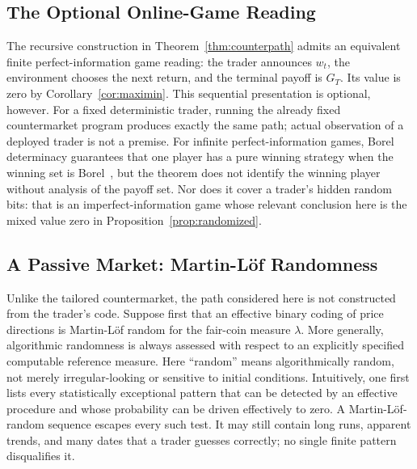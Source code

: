 \documentclass[aps,pra,reprint,superscriptaddress,amsmath,amssymb,floatfix]{revtex4-2}
\theoremstyle{plain}
\theoremstyle{definition}
\theoremstyle{remark}
\begin{document}
\subsection{The Optional Online-Game Reading}

The recursive construction in Theorem~\ref{thm:counterpath} admits an
equivalent finite perfect-information game reading: the trader announces
\(w_t\), the environment chooses the next return, and the terminal payoff is
\(G_T\). Its value is zero by Corollary~\ref{cor:maximin}. This sequential
presentation is optional, however. For a fixed deterministic trader, running
the already fixed countermarket program produces exactly the same path; actual
observation of a deployed trader is not a premise. For infinite
perfect-information games, Borel determinacy guarantees that one player has a
pure winning strategy when the winning set is Borel~\cite{Martin1975}, but the
theorem does not identify the winning player without analysis of the payoff
set. Nor does it cover a trader's hidden random bits: that is an
imperfect-information game whose relevant conclusion here is the mixed value
zero in Proposition~\ref{prop:randomized}.

\subsection{A Passive Market: Martin-L\"of Randomness}

Unlike the tailored countermarket, the path considered here is not constructed
from the trader's code. Suppose first that an effective binary coding of price
directions is Martin-L\"of random for the fair-coin measure \(\lambda\). More
generally, algorithmic randomness is always assessed with respect to an
explicitly specified computable reference measure. Here ``random'' means
algorithmically random, not merely irregular-looking or sensitive to initial
conditions. Intuitively, one first lists every
statistically exceptional pattern that can be detected by an effective
procedure and whose probability can be driven effectively to zero. A
Martin-L\"of-random sequence escapes every such test. It may still contain long
runs, apparent trends, and many dates that a trader guesses correctly; no
single finite pattern disqualifies it.
\end{document}
